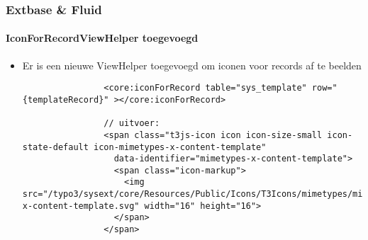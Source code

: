 \begin{frame}[fragile]
	\frametitle{Extbase \& Fluid}
	\framesubtitle{IconForRecordViewHelper toegevoegd}

	\lstset{basicstyle=\tiny\ttfamily}

	\begin{itemize}

		\item Er is een nieuwe ViewHelper toegevoegd om iconen voor records af te beelden

			\begin{lstlisting}
				<core:iconForRecord table="sys_template" row="{templateRecord}" ></core:iconForRecord>

				// uitvoer:
				<span class="t3js-icon icon icon-size-small icon-state-default icon-mimetypes-x-content-template"
				  data-identifier="mimetypes-x-content-template">
				  <span class="icon-markup">
				    <img src="/typo3/sysext/core/Resources/Public/Icons/T3Icons/mimetypes/mimetypes-x-content-template.svg" width="16" height="16">
				  </span>
				</span>
			\end{lstlisting}

	\end{itemize}

\end{frame}


